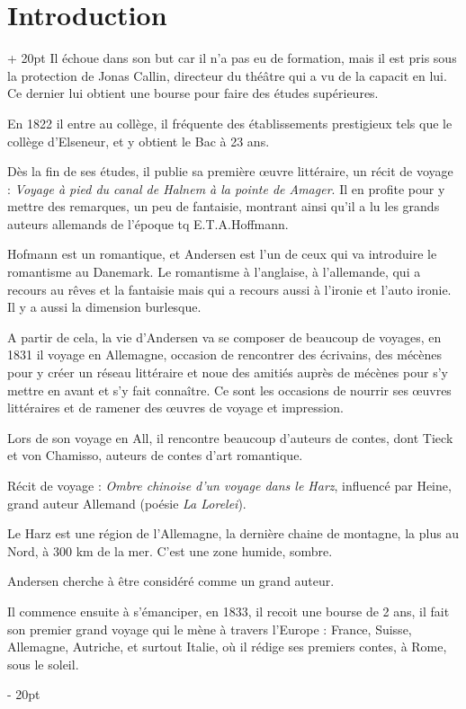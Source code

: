 \documentclass[a4paper, 12pt, twoside]{article}
\newcommand{\ind}[1][20pt]{\advance\leftskip + #1}
\newcommand{\deind}[1][20pt]{\advance\leftskip - #1}
\newenvironment{indt}[2][20pt]{#2 \par \ind[#1]}{\par \deind} %
\begin{document}
\begin{indt}{\section*{Introduction}}
        Il échoue dans son but car il n'a pas eu de formation, mais il est pris sous la protection de Jonas Callin, directeur du théâtre qui a vu de la capacit en lui. Ce dernier lui obtient une bourse pour faire des études supérieures.
        
        En 1822 il entre au collège, il fréquente des établissements prestigieux tels que le collège d'Elseneur, et y obtient le Bac à 23 ans.
        
        Dès la fin de ses études, il publie sa première \oe uvre littéraire, un récit de voyage : \textit{Voyage à pied du canal de Halnem à la pointe de Amager}. Il en profite pour y mettre des remarques, un peu de fantaisie, montrant ainsi qu'il a lu les grands auteurs allemands de l'époque tq E.T.A.Hoffmann.
        
        Hofmann est un romantique, et Andersen est l'un de ceux qui va introduire le romantisme au Danemark. Le romantisme à l'anglaise, à l'allemande, qui a recours au rêves et la fantaisie mais qui a recours aussi à l'ironie et l'auto ironie. Il y a aussi la dimension burlesque.
        
        A partir de cela, la vie d’Andersen va se composer de beaucoup de voyages, en 1831 il voyage en Allemagne, occasion de rencontrer des écrivains, des mécènes pour y créer un réseau littéraire et noue des amitiés auprès de mécènes pour s'y mettre en avant et s'y fait connaître. Ce sont les occasions de nourrir ses \oe uvres littéraires et de ramener des \oe uvres de voyage et impression.
        
        Lors de son voyage en All, il rencontre beaucoup d'auteurs de contes, dont Tieck et von Chamisso, auteurs de contes d'art romantique.
        
        Récit de voyage : \textit{Ombre chinoise d'un voyage dans le Harz}, influencé par Heine, grand auteur Allemand (poésie \textit{La Lorelei}).
        
        Le Harz est une région de l'Allemagne, la dernière chaine de montagne, la plus au Nord, à 300 km de la mer. C'est une zone humide, sombre.
        
        \vspace{12pt}
        
        Andersen cherche à être considéré comme un grand auteur.
        
        \vspace{12pt}
        
        Il commence ensuite à s'émanciper, en 1833, il recoit une bourse de 2 ans, il fait son premier grand voyage qui le mène à travers l'Europe : France, Suisse, Allemagne, Autriche, et surtout Italie, où il rédige ses premiers contes, à Rome, sous le soleil.
        

\end{indt}
\end{document}
